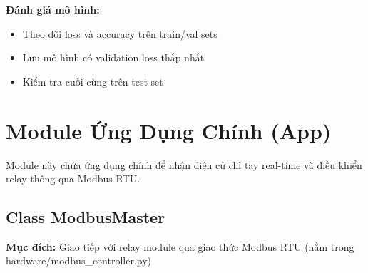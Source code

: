 \textbf{Đánh giá mô hình:}
\begin{itemize}
    \item Theo dõi loss và accuracy trên train/val sets
    \item Lưu mô hình có validation loss thấp nhất
    \item Kiểm tra cuối cùng trên test set
\end{itemize}


\section{Module Ứng Dụng Chính (App)}

Module này chứa ứng dụng chính để nhận diện cử chỉ tay real-time và điều khiển relay thông qua Modbus RTU.

\subsection{Class ModbusMaster}
\textbf{Mục đích:} Giao tiếp với relay module qua giao thức Modbus RTU (nằm trong hardware/modbus\_controller.py)

